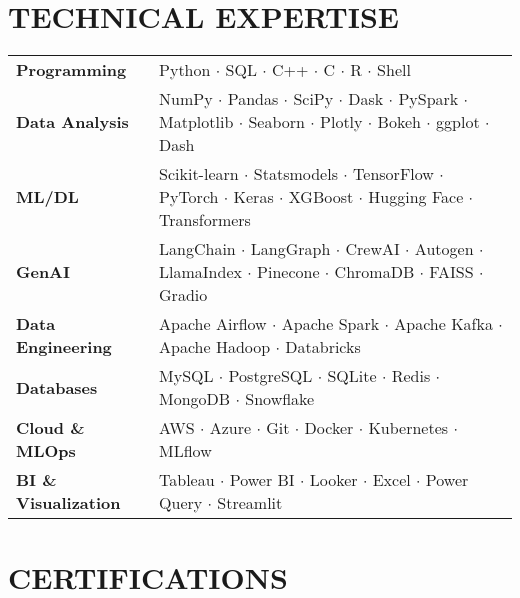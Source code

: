 \documentclass[a4paper,11pt]{article}
\newcommand{\skillsection}[2]{%
    {\textbf{#1}} & #2 \\[0.1em]%
}
\begin{document}
\section{TECHNICAL EXPERTISE}

\vspace{0.2em}
\begin{tabular}{@{}p{}@{}p{}@{}}
\skillsection{Programming}{Python $\cdot$ SQL $\cdot$ C++ $\cdot$ C $\cdot$ R $\cdot$ Shell} 
\skillsection{Data Analysis}{NumPy $\cdot$ Pandas $\cdot$ SciPy $\cdot$ Dask $\cdot$ PySpark $\cdot$ Matplotlib $\cdot$ Seaborn $\cdot$ Plotly $\cdot$ Bokeh $\cdot$ ggplot $\cdot$ Dash} 
\skillsection{ML/DL}{Scikit-learn $\cdot$ Statsmodels $\cdot$ TensorFlow $\cdot$ PyTorch $\cdot$ Keras $\cdot$ XGBoost $\cdot$ Hugging Face $\cdot$ Transformers} 
\skillsection{GenAI}{LangChain $\cdot$ LangGraph $\cdot$ CrewAI $\cdot$ Autogen $\cdot$ LlamaIndex $\cdot$ Pinecone $\cdot$ ChromaDB $\cdot$ FAISS $\cdot$ Gradio} 
\skillsection{Data Engineering}{Apache Airflow $\cdot$ Apache Spark $\cdot$ Apache Kafka $\cdot$ Apache Hadoop $\cdot$ Databricks} 
\skillsection{Databases}{MySQL $\cdot$ PostgreSQL $\cdot$ SQLite $\cdot$ Redis $\cdot$ MongoDB $\cdot$ Snowflake} 
\skillsection{Cloud \& MLOps}{AWS $\cdot$ Azure $\cdot$ Git $\cdot$ Docker $\cdot$ Kubernetes $\cdot$ MLflow} 
\skillsection{BI \& Visualization}{Tableau $\cdot$ Power BI $\cdot$ Looker $\cdot$ Excel $\cdot$ Power Query $\cdot$ Streamlit} 
\end{tabular}
\vspace{0.2em}

\section{CERTIFICATIONS}
\end{document}

